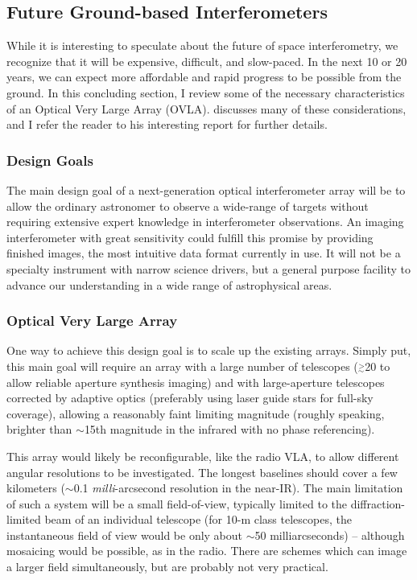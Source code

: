 \documentclass[12pt]{article}
\newcommand{\simge}{\mbox{$\stackrel{>}{_{\sim}}$}}
\begin{document}
\subsection{Future Ground-based Interferometers}

While it is interesting to speculate about the future of space
interferometry, we recognize that it will be expensive, difficult, and
slow-paced.  In the next 10 or 20 years, we can expect more affordable
and rapid progress to be possible from the ground.  In this concluding
section, I review some of the necessary characteristics of an Optical
Very Large Array (OVLA).  \citet{ridgway2000} discusses many of these
considerations, and I refer the reader to his interesting report for 
further details.

\subsubsection{Design Goals}
The main design goal of a next-generation optical interferometer array
will be to allow the ordinary astronomer to observe a wide-range of
targets without requiring extensive expert knowledge in interferometer
observations.  An imaging interferometer with great sensitivity could
fulfill this promise by providing finished images, the most intuitive
data format currently in use. It will not be a specialty instrument
with narrow science drivers, but a general purpose facility to advance
our understanding in a wide range of astrophysical areas.

\subsubsection{Optical Very Large Array}
One way to achieve this design goal is to scale up the existing
arrays.  Simply put, this main goal will require an array with a large
number of telescopes ($\simge$20 to allow reliable aperture synthesis
imaging) and with large-aperture telescopes corrected by adaptive
optics (preferably using laser guide stars for full-sky coverage),
allowing a reasonably faint limiting magnitude (roughly speaking,
brighter than $\sim$15th magnitude in the infrared with no phase
referencing).

This array would likely be reconfigurable, like the radio VLA, to
allow different angular resolutions to be investigated. The longest
baselines should cover a few kilometers ($\sim$0.1 {\em
  milli}-arcsecond resolution in the near-IR).  The main limitation of
such a system will be a small field-of-view, typically limited to the
diffraction-limited beam of an individual telescope (for 10-m class
telescopes, the instantaneous field of view would be only about
$\sim$50 milliarcseconds) -- although mosaicing would be possible, as
in the radio.  There are schemes which can image a larger field
simultaneously, but are probably not very practical.
\end{document}
